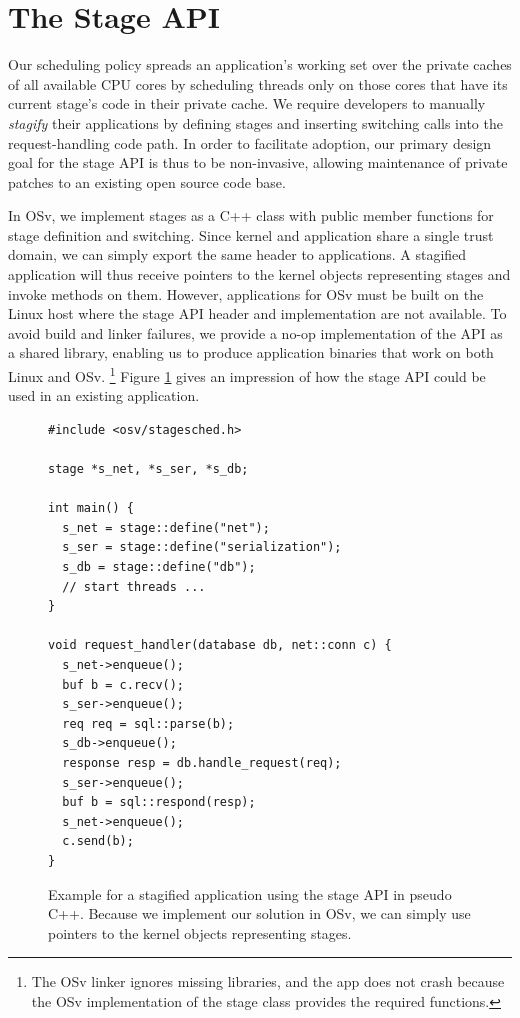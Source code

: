 \documentclass[12pt,a4paper]{book}
\begin{document}
\section{The Stage API}\label{ch:di:api}
Our scheduling policy spreads an application's working set over the private caches of all available CPU cores by scheduling threads only on those cores that have its current stage's code in their private cache.
We require developers to manually \emph{stagify} their applications by defining stages and inserting switching calls into the request-handling code path.
In order to facilitate adoption, our primary design goal for the stage API is thus to be non-invasive, allowing maintenance of private patches to an existing open source code base.

In OSv, we implement stages as a C++ class with public member functions for stage definition and switching.
Since kernel and application share a single trust domain, we can simply export the same header to applications.
A stagified application will thus receive pointers to the kernel objects representing stages and invoke methods on them.
However, applications for OSv must be built on the Linux host where the stage API header and implementation are not available.
To avoid build and linker failures, we provide a no-op implementation of the API as a shared library, enabling us to produce application binaries that work on both Linux and OSv.%
\footnote{The OSv linker ignores missing libraries, and the app does not crash because the OSv implementation of the stage class provides the required functions.}
Figure \ref{fig:di:api:exampleraw} gives an impression of how the stage API could be used in an existing application.

\begin{figure}
\begin{lstlisting}[style=figurecpp,morekeywords={stage,stage::define,enqueue}]
#include <osv/stagesched.h>

stage *s_net, *s_ser, *s_db;

int main() {
  s_net = stage::define("net");
  s_ser = stage::define("serialization");
  s_db = stage::define("db");
  // start threads ...
}

void request_handler(database db, net::conn c) {
  s_net->enqueue();
  buf b = c.recv();
  s_ser->enqueue();
  req req = sql::parse(b);
  s_db->enqueue();
  response resp = db.handle_request(req);
  s_ser->enqueue();
  buf b = sql::respond(resp);
  s_net->enqueue();
  c.send(b);
}
\end{lstlisting}
\caption{Example for a stagified application using the stage API in pseudo C++. Because we implement our solution in OSv, we can simply use pointers to the kernel objects representing stages.}
\label{fig:di:api:exampleraw}
\end{figure}
\end{document}

